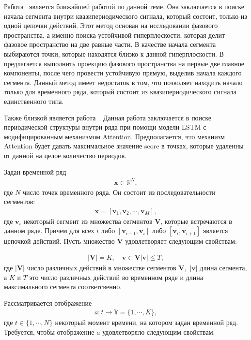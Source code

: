 Работа~\cite{motrenko2015} является ближайшей работой по данной теме. Она заключается в поиске начала сегмента внутри квазипериодического сигнала, который состоит, только из одной цепочки действий. Этот метод основан на исследовании фазового пространства, а именно поиска устойчивой гиперплоскости, которая делит фазовое пространство на две равные части. В качестве начала сегмента выбираются точки, которые находятся близко к данной гиперплоскости. В~\cite{motrenko2015} предлагается выполнить проекцию фазового пространства на первые две главное компоненты, после чего провести устойчивую прямую, выделив начала каждого сегмента. 
Данный метод имеет недостаток в том, что позволяет находить начало только для временного ряда, который состоит из квазипериодического сигнала единственного типа.


Также близкой является работа~\cite{cinar2018}.  Данная работа заключается в поиске периодической структуры внутри ряда при помощи модели LSTM с модифицированным механизмом Attention. Предполагается, что механизм Attention будет давать максимальное значение score в точках, которые удаленны от данной на целое количество периодов.

Задан временной ряд
\[
\label{eq:st:1}
\begin{aligned}
\textbf{x} \in \mathbb{R}^{N},
\end{aligned}
\]
где $N$ число точек временного ряда. Он состоит из последовательности сегментов:
\[
\label{eq:st:2}
\begin{aligned}
\textbf{x} = [\textbf{v}_1, \textbf{v}_2, \cdots, \textbf{v}_M],
\end{aligned}
\]
где $\textbf{v}_i$ некоторый сегмент из множества сегментов $\mathbf{V}$, которые встречаются в данном ряде. 
Причем для всех $i$ либо $[\textbf{v}_{i-1},\textbf{v}_{i}]$ либо $[\textbf{v}_{i},\textbf{v}_{i+1}]$  является цепочкой действий. Пусть множество $\mathbf{V}$ удовлетворяет следующим свойствам:

\[
\label{eq:st:3}
\begin{aligned}
\left|\mathbf{V}\right| = K, \quad \textbf{v} \in \mathbf{V} \left|\textbf{v}\right| \leq T,
\end{aligned}
\]
где $\left|\mathbf{V}\right|$ число различных действий в множестве сегментов $\mathbf{V},$ $\left|\textbf{v}\right|$ длина сегмента, а $K$ и $T$ это число различных действий во временном ряде и длина максимального сегмента соответсвенно.

Рассматривается отображение
\[
\label{eq:st:4}
\begin{aligned}
a : t \to \mathbb{Y} = \{1,\cdots, K\}, 
\end{aligned}
\]
где $t \in \{1,\cdots, N\}$ некоторый момент времени, на котором задан временной ряд.
Требуется, чтобы отображение $a$ удовлетворяло следующим свойствам:

